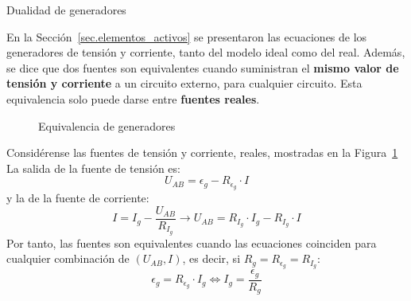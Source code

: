\documentclass[11pt]{book} %
\makeatletter
\numberwithin{dummy}{section}
\theoremstyle{ocrenumbox}
\theoremstyle{blacknumex}
\theoremstyle{blacknumbox}
\theoremstyle{ocrenum}
\renewcommand{\subsubsection}{\@startsection {subsubsection}{3}{\z@}
{-2ex \@plus -0.1ex \@minus -.2ex}
{.2ex \@plus.2ex }
{\normalfont\small\sffamily\bfseries}}
\makeatother
\begin{document}
	\subsubsection{Dualidad de generadores}\label{sec.dualidad}
	
	En la Sección~\ref{sec.elementos_activos} se presentaron las ecuaciones de los generadores de tensión y corriente, tanto del modelo ideal como del real. Además, se dice que dos fuentes son equivalentes cuando suministran el \textbf{mismo valor de tensión y corriente} a un circuito externo, para cualquier circuito. Esta equivalencia solo puede darse entre \textbf{fuentes reales}.
	
	\begin{figure}[htbp]
		\centering
		\hfil
		\caption{Equivalencia de generadores}
		\label{fig.equivalencia_generadores}
	\end{figure}
	
	Considérense las fuentes de tensión y corriente, reales, mostradas en la Figura~\ref{fig.equivalencia_generadores}
	La salida de la fuente de tensión es:
	\begin{equation*}
		U_{AB} = \epsilon_g - R_{\epsilon_g} \cdot I
	\end{equation*}
	y la de la fuente de corriente:
	\begin{equation*}
		I = I_g - \frac{U_{AB}}{R_{I_g}} \rightarrow U_{AB} = R_{I_g} \cdot I_g - R_{I_g} \cdot I
	\end{equation*} 
	Por tanto, las fuentes son equivalentes cuando las ecuaciones coinciden para cualquier combinación de $(U_{AB}, I)$, es decir, si $R_g = R_{\epsilon_g} = R_{I_g}$:
	\begin{equation}\label{eq.equivalencia_fuentes}
		\boxed{\epsilon_g = R_{\epsilon_g} \cdot I_g \Leftrightarrow {I_g = \frac{\epsilon_g}{R_g}}}  
	\end{equation}
	
\end{document}
